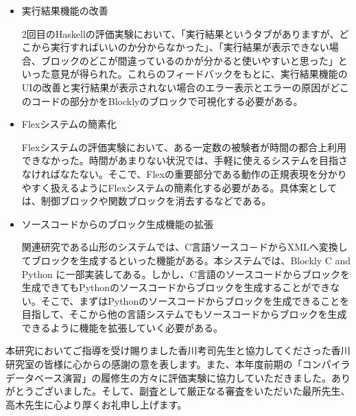 \documentclass{risepaper}
\begin{document}
\begin{itemize}

\item 実行結果機能の改善

2回目のHaskellの評価実験において、「実行結果というタブがありますが、どこから実行すればいいのか分からなかった」、「実行結果が表示できない場合、ブロックのどこが間違っているのかが分かると使いやすいと思った」といった意見が得られた。これらのフィードバックをもとに、実行結果機能のUIの改善と実行結果が表示されない場合のエラー表示とエラーの原因がどこのコードの部分かをBlocklyのブロックで可視化する必要がある。

\item Flexシステムの簡素化

Flexシステムの評価実験において、ある一定数の被験者が時間の都合上利用できなかった。時間があまりない状況では、手軽に使えるシステムを目指さなければなたない。そこで、Flexの重要部分である動作の正規表現を分かりやすく扱えるようにFlexシステムの簡素化する必要がある。具体案としては、制御ブロックや関数ブロックを消去するなどである。

\item ソースコードからのブロック生成機能の拡張

関連研究である山形のシステムでは、C言語ソースコ－ドからXMLへ変換してブロックを生成するといった機能がある。本システムでは、Blockly C and Python に一部実装してある。しかし、C言語のソースコードからブロックを生成できてもPythonのソースコードからブロックを生成することができない。そこで、まずはPythonのソースコードからブロックを生成できることを目指して、そこから他の言語システムでもソースコードからブロックを生成できるように機能を拡張していく必要がある。

\end{itemize} 
 

\acknowledgment  %

本研究においてご指導を受け賜りました香川考司先生と協力してくださった香川研究室の皆様に心からの感謝の意を表します。また、本年度前期の「コンパイラデータベース演習」の履修生の方々に評価実験に協力していただきました。ありがとうございました。そして、副査として厳正なる審査をいただいた最所先生、高木先生に心より厚くお礼申し上げます。
\end{document}
